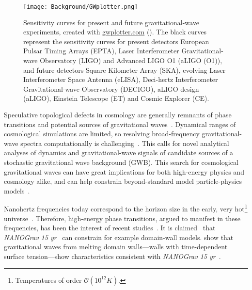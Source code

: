 \begin{figure}[hb]
    \centering
    \texttt{[image: Background/GWplotter.png]}
    \caption{Sensitivity curves for present and future gravitational-wave experiments, created with \href{http://www.sr.bham.ac.uk/~cplb/GWplotter/}{\textsf{gwplotter.com}} (\thismonthyear). The black curves represent the sensitivity curves for present detectors European Pulsar Timing Arrays (EPTA), Laser Interferometer Gravitational-wave Observatory (LIGO) and Advanced LIGO O1 (aLIGO (O1)), and future detectors Square Kilometer Array (SKA), evolving Laser Interferometer Space Antenna (eLISA), Deci-hertz Interferometer Gravitational-wave Observatory (DECIGO), aLIGO design (aLIGO), Einstein Telescope (ET) and Cosmic Explorer (CE).}
    \label{fig:intro:GWplotter}
\end{figure}


Speculative topological defects in cosmology are generally remnants of phase transitions and potential sources of gravitational waves~\citep{christiansenGravitationalWavesDark2024,saikawaReviewGravitationalWaves2017}. Dynamical ranges of cosmological simulations are limited, so resolving broad-frequency gravitational-wave spectra computationally is challenging~\citep{saikawaReviewGravitationalWaves2017}. \hypertarget{sentence1}{This calls for novel analytical analyses of dynamics and gravitational-wave signals} of candidate sources of a stochastic gravitational wave background (GWB). This search for cosmological gravitational waves can have great implications for both high-energy physics and cosmology alike, and can help constrain beyond-standard model particle-physics models~\citep{kawasakiStudyGravitationalRadiation2011}.


Nanohertz frequencies today correspond to the horizon size in the early, very hot\footnote{Temperatures of order $\mathscr{O}(10^{12}\unit{K})$.} %
universe~\citep{christiansenGravitationalWavesDark2024}. Therefore, high-energy phase transitions, argued to manifest in these frequencies, has been the interest of recent studies~\citep{babichevNANOGravSpectralIndex2023,saikawaReviewGravitationalWaves2017,liProbingHighTemperature2023,hiramatsuGravitationalWavesCollapsing2010}. It is claimed~\citep{afzalNANOGrav15Yr2023} that \textit{NANOGrav 15 yr}~\cite{agazieNANOGrav15Yr2023a} can constrain for example domain-wall models.  show that gravitational waves from melting domain walls---walls with time-dependent surface tension---show characteristics consistent with \textit{NANOGrav 15 yr}~\cite{agazieNANOGrav15Yr2023a}.  



